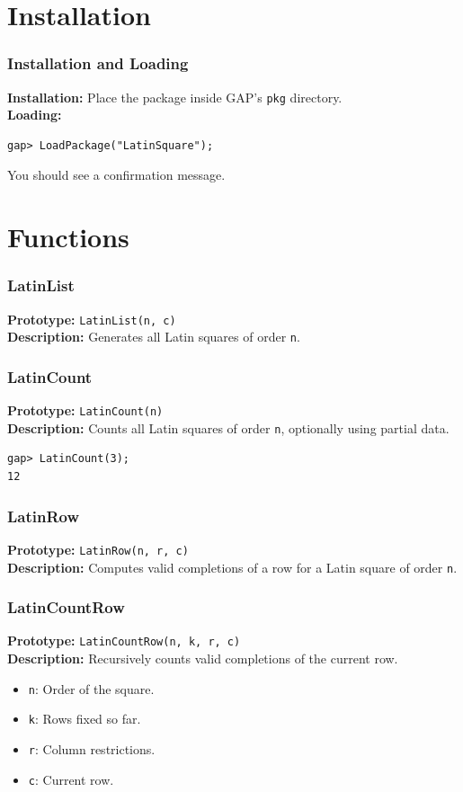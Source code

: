 \documentclass{beamer}
\begin{document}
\section{Installation}
\begin{frame}[fragile]
\frametitle{Installation and Loading}
\textbf{Installation:}  
Place the package inside GAP's \texttt{pkg} directory.\\
\textbf{Loading:}
\begin{lstlisting}
gap> LoadPackage("LatinSquare");
\end{lstlisting}
You should see a confirmation message.
\end{frame}

\section{Functions}
\begin{frame}[fragile]
\frametitle{LatinList}
\textbf{Prototype:} \texttt{LatinList(n, c)}\\
\textbf{Description:} Generates all Latin squares of order \texttt{n}.
\end{frame}

\begin{frame}[fragile]
\frametitle{LatinCount}
\textbf{Prototype:} \texttt{LatinCount(n)}\\
\textbf{Description:} Counts all Latin squares of order \texttt{n}, optionally using partial data.
\begin{lstlisting}
gap> LatinCount(3);
12
\end{lstlisting}
\end{frame}

\begin{frame}[fragile]
\frametitle{LatinRow}
\textbf{Prototype:} \texttt{LatinRow(n, r, c)}\\
\textbf{Description:} Computes valid completions of a row for a Latin square of order \texttt{n}.
\end{frame}

\begin{frame}[fragile]
\frametitle{LatinCountRow}
\textbf{Prototype:} \texttt{LatinCountRow(n, k, r, c)}\\
\textbf{Description:} Recursively counts valid completions of the current row.
\begin{itemize}
  \item \texttt{n}: Order of the square.
  \item \texttt{k}: Rows fixed so far.
  \item \texttt{r}: Column restrictions.
  \item \texttt{c}: Current row.
\end{itemize}
\end{frame}
\end{document}
